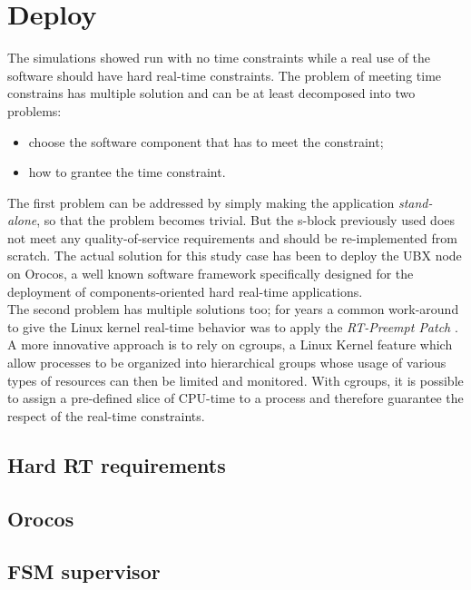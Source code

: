\chapter{Deploy}
\label{ch:deploy} 
The simulations showed run with no time constraints while a real use of the software should have hard real-time constraints. The problem of meeting time constrains has multiple solution and can be at least decomposed into two problems:
\begin{itemize}
	\item choose the software component that has to meet the constraint;
	\item how to grantee the time constraint.
\end{itemize}

The first problem can be addressed by simply making the application \emph{stand-alone}, so that the problem becomes trivial. But the s-block previously used does not meet any quality-of-service requirements and should be re-implemented from scratch. The actual solution for this study case has been to deploy the UBX node on Orocos\autocite{bib:orocos}, a well known software framework specifically designed for the deployment of components-oriented hard real-time applications.\\
The second problem has multiple solutions too; for years a common work-around to give the Linux kernel real-time behavior was to apply the \emph{RT-Preempt Patch} \autocite{bib:rtlinux}. A more innovative approach is to rely on cgroups, a Linux Kernel feature which allow processes to be organized into hierarchical groups whose usage of various types of resources can then be limited and monitored\autocite{bib:cgroupsman}. With cgroups, it is possible to assign a pre-defined slice of CPU-time to a process and therefore guarantee the respect of the real-time constraints.

\section{Hard RT requirements}

\section{Orocos}

\section{FSM supervisor}
